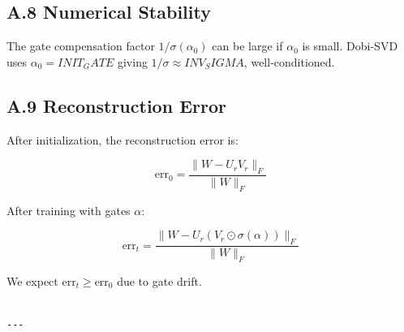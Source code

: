 \subsection{A.8 Numerical Stability}

The gate compensation factor $1/\sigma(\alpha_0)$ can be large if 
$\alpha_0$ is small. Dobi-SVD uses $\alpha_0 = {{INIT_GATE}}$ giving 
$1/\sigma \approx {{INV_SIGMA}}$, well-conditioned.

\subsection{A.9 Reconstruction Error}

After initialization, the reconstruction error is:

\[
\text{err}_0 = \frac{\|W - U_r V_r\|_F}{\|W\|_F}
\tag{A.8}
\]

After training with gates $\alpha$:

\[
\text{err}_t = \frac{\|W - U_r (V_r \odot \sigma(\alpha))\|_F}{\|W\|_F}
\tag{A.9}
\]

We expect $\text{err}_t \geq \text{err}_0$ due to gate drift.
\begin{lstlisting}

---
\end{lstlisting}